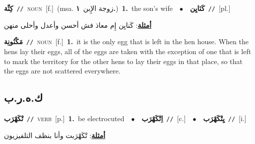 \documentclass[10pt,a4paper,twoside]{article} %
\begin{document}
\begin{multicols}{2}
{\setlength\topsep{0pt}\textbf{\foreignlanguage{arabic}{كِنِّة}}\ {\color{gray}\texttt{//}\color{black}}\ \textsc{noun}\ [f.]\ \color{gray}(msa. \foreignlanguage{arabic}{زوجة الإِبن}~\foreignlanguage{arabic}{\textbf{١.}})\color{black}\ \textbf{1.}~the son's wife\ \ $\bullet$\ \ \setlength\topsep{0pt}\textbf{\foreignlanguage{arabic}{كَنَايِن}}\ {\color{gray}\texttt{//}\color{black}}\ [pl.]\  \begin{flushright}\color{gray}\foreignlanguage{arabic}{\textbf{\underline{\foreignlanguage{arabic}{أمثلة}}}: كَنايِن إِم معاذ فش أحسن وأعدل وأحلى منهن}\end{flushright}\color{black}} \vspace{2mm}

{\setlength\topsep{0pt}\textbf{\foreignlanguage{arabic}{مَكْنُونِة}}\ {\color{gray}\texttt{//}\color{black}}\ \textsc{noun}\ [f.]\ \textbf{1.}~it is the only egg that is left in the hen house. When the hens lay their eggs, all of the eggs are taken with the exception of one that is left to mark the territory for the other hens to lay their eggs in that place, so that the eggs are not scattered everywhere.\ } \vspace{2mm}

\vspace{-3mm}
\subsection*{\color{blue}\foreignlanguage{arabic}{ك.ه.ر.ب}\color{blue}{}} 

{\setlength\topsep{0pt}\textbf{\foreignlanguage{arabic}{تْكَهْرَب}}\ {\color{gray}\texttt{//}\color{black}}\ \textsc{verb}\ [p.]\ \textbf{1.}~be electrocuted\ \ $\bullet$\ \ \setlength\topsep{0pt}\textbf{\foreignlanguage{arabic}{اِتْكَهْرَب}}\ {\color{gray}\texttt{//}\color{black}}\ [c.]\ \ $\bullet$\ \ \setlength\topsep{0pt}\textbf{\foreignlanguage{arabic}{يِتْكَهْرَب}}\ {\color{gray}\texttt{//}\color{black}}\ [i.]\  \begin{flushright}\color{gray}\foreignlanguage{arabic}{\textbf{\underline{\foreignlanguage{arabic}{أمثلة}}}: تْكَهْرَبت وأنا بنظف التلفيزيون}\end{flushright}\color{black}} \vspace{2mm}


\end{multicols}
\end{document}
